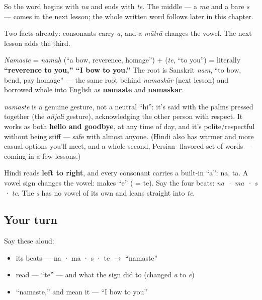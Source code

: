 So the word begins with \textbf{} \emph{na} and ends with \textbf{} \emph{te}. The middle — a \emph{ma} and a bare \emph{s} — comes in the next lesson; the whole written word follows later in this chapter.

Two facts already: consonants carry \emph{a}, and a \emph{mātrā} changes the vowel. The next lesson adds the third.

\begin{cousinweb}
\emph{Namaste} = \emph{namaḥ} (\textquotedblleft{}a bow, reverence, homage\textquotedblright{}) + \textbf{} (\emph{te}, \textquotedblleft{}to you\textquotedblright{}) = literally \textbf{\textquotedblleft{}reverence to you,\textquotedblright{} \textquotedblleft{}I bow to you.\textquotedblright{}} The root is Sanskrit \emph{nam}, \textquotedblleft{}to bow, bend, pay homage\textquotedblright{} — the same root behind \emph{namaskār} (next lesson) and borrowed whole into English as \textbf{namaste} and \textbf{namaskar}.
\end{cousinweb}

\begin{culture}
\emph{namaste} is a genuine gesture, not a neutral \textquotedblleft{}hi\textquotedblright{}: it's said with the palms pressed together (the \emph{añjali} gesture), acknowledging the other person with respect. It works as both \textbf{hello and goodbye}, at any time of day, and it's polite/respectful without being stiff — safe with almost anyone. (Hindi also has warmer and more casual options you'll meet, and a whole second, Persian- flavored set of words — coming in a few lessons.)
\end{culture}

\begin{sounds}
Hindi reads \textbf{left to right}, and every consonant carries a built-in “a”:  na,  ta. A vowel sign changes the vowel:  makes “e” ( = te). Say the four beats: \emph{na · ma · s · te}. The \emph{s} has no vowel of its own and leans straight into \emph{te}.
\end{sounds}

\subsection*{Your turn}
Say these aloud:

\begin{itemize}
\raggedright
  \item its beats — na · ma · s · te $\to$ \textquotedblleft{}namaste\textquotedblright{}
  \item read  — \textquotedblleft{}te\textquotedblright{} — and what the sign  did to  (changed \emph{a} to \emph{e})
  \item \textquotedblleft{}namaste,\textquotedblright{} and mean it — \textquotedblleft{}I bow to you\textquotedblright{}
\end{itemize}

